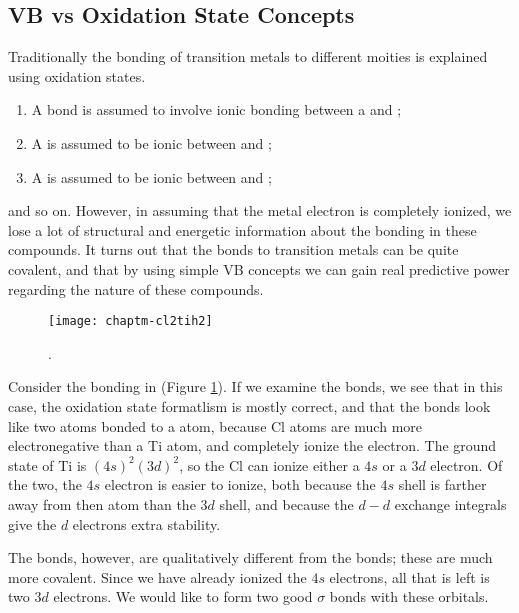 \subsection{VB vs Oxidation State Concepts}
\label{vb-tm-sect}
Traditionally the bonding of transition metals to different moities is
explained using oxidation states.
\begin{enumerate}
\item A  bond is assumed to
  involve ionic bonding between a  and ;
\item A  is assumed to be ionic between  and
;
\item A  is assumed to be ionic between  and
;
\end{enumerate}
and so on. However, in assuming that the metal electron is completely
ionized, we lose a lot of structural and energetic information about
the bonding in these compounds. It turns out that the bonds to
transition metals can be quite covalent, and that by using simple VB
concepts we can gain real predictive power regarding the nature of
these compounds.

\begin{figure}
\begin{center}
\texttt{[image: chaptm-cl2tih2]}
\end{center}
\caption{.}
\label{chaptm-cl2tih2}
\end{figure}

Consider the bonding in  (Figure
\ref{chaptm-cl2tih2}). If we examine the  bonds, we see
that in this case, the oxidation state formatlism is mostly correct,
and that the bonds look like two  atoms bonded to a
 atom, because Cl atoms are much more electronegative
than a Ti atom, and completely ionize the electron. The ground state
of Ti is $(4s)^2(3d)^2$, so the Cl can ionize either a $4s$ or a $3d$
electron. Of the two, the $4s$ electron is easier to ionize, both
because the $4s$ shell is farther away from then atom than the $3d$
shell, and because the $d-d$ exchange integrals give the $d$ electrons
extra stability.

The  bonds, however, are qualitatively different from the
 bonds; these are much more covalent. Since we have
already ionized the $4s$ electrons, all that is left is two $3d$
electrons. We would like to form two good $\sigma$ bonds with these
orbitals.

